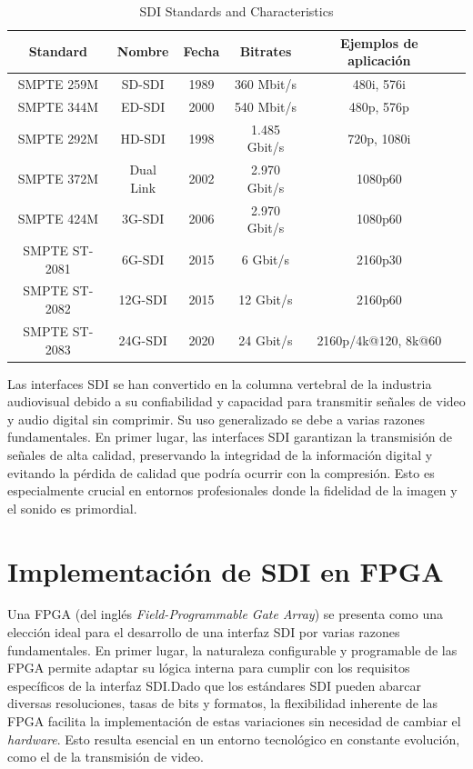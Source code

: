\begin{table}[h]
    \centering
    \begin{tabular}{cccccc}
        \toprule
        \textbf{Standard} & \textbf{Nombre} & \textbf{Fecha} & \textbf{Bitrates} & \textbf{Ejemplos de aplicación} \\
        \midrule
        SMPTE 259M      & SD-SDI    & 1989 & 360 Mbit/s     & 480i, 576i \\
        SMPTE 344M      & ED-SDI    & 2000 & 540 Mbit/s     & 480p, 576p \\
        SMPTE 292M      & HD-SDI    & 1998 & 1.485 Gbit/s   & 720p, 1080i \\
        SMPTE 372M      & Dual Link & 2002 & 2.970 Gbit/s   & 1080p60 \\
        SMPTE 424M      & 3G-SDI    & 2006 & 2.970 Gbit/s   & 1080p60 \\
        SMPTE ST-2081   & 6G-SDI    & 2015 & 6 Gbit/s       & 2160p30 \\
        SMPTE ST-2082   & 12G-SDI   & 2015 & 12 Gbit/s      & 2160p60 \\
        SMPTE ST-2083   & 24G-SDI   & 2020 & 24 Gbit/s      & 2160p/4k@120, 8k@60 \\
        \bottomrule
    \end{tabular}
    \caption{SDI Standards and Characteristics}\label{tab:sdi_standards}
\end{table}

Las interfaces SDI se han convertido en la columna vertebral de la industria
audiovisual debido a su confiabilidad y capacidad para transmitir señales de
video y audio digital sin comprimir. Su uso generalizado se debe a varias
razones fundamentales. En primer lugar, las interfaces SDI garantizan la
transmisión de señales de alta calidad, preservando la integridad de la
información digital y evitando la pérdida de calidad que podría ocurrir con la
compresión. Esto es especialmente crucial en entornos profesionales donde la
fidelidad de la imagen y el sonido es primordial.

\section{Implementación de SDI en FPGA}

Una FPGA (del inglés \textit{Field-Programmable Gate Array}) se presenta como
una elección ideal para el desarrollo de una interfaz SDI por varias razones
fundamentales. En primer lugar, la naturaleza configurable y programable de las
FPGA permite adaptar su lógica interna para cumplir con los requisitos
específicos de la interfaz SDI.\@ Dado que los estándares SDI pueden abarcar
diversas resoluciones, tasas de bits y formatos, la flexibilidad inherente de
las FPGA facilita la implementación de estas variaciones sin necesidad de
cambiar el \textit{hardware}. Esto resulta esencial en un entorno tecnológico
en constante evolución, como el de la transmisión de video.

